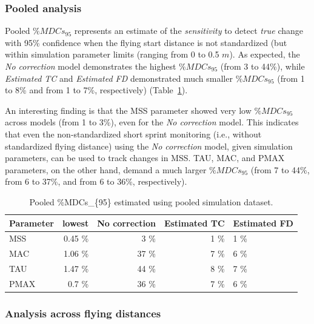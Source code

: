 \documentclass[
  letterpaper,
  DIV=11,
  numbers=noendperiod]{scrartcl}
\begin{document}
\hypertarget{pooled-analysis-1}{%
\subsubsection{Pooled analysis}\label{pooled-analysis-1}}

Pooled \(\%MDCs_{95}\) represents an estimate of the \emph{sensitivity}
to detect \emph{true} change with 95\% confidence when the flying start
distance is not standardized (but within simulation parameter limits
(ranging from 0 to 0.5 \(m\)). As expected, the \emph{No correction}
model demonstrates the highest \(\%MDCs_{95}\) (from 3 to 44\%), while
\emph{Estimated TC} and \emph{Estimated FD} demonstrated much smaller
\(\%MDCs_{95}\) (from 1 to 8\% and from 1 to 7\%, respectively)
(Table~\ref{tbl-pooled-MDC}).

An interesting finding is that the MSS parameter showed very low
\(\%MDCs_{95}\) across models (from 1 to 3\%), even for the \emph{No
correction} model. This indicates that even the non-standardized short
sprint monitoring (i.e., without standardized flying distance) using the
\emph{No correction} model, given simulation parameters, can be used to
track changes in MSS. TAU, MAC, and PMAX parameters, on the other hand,
demand a much larger \(\%MDCs_{95}\) (from 7 to 44\%, from 6 to 37\%,
and from 6 to 36\%, respectively).

\hypertarget{tbl-pooled-MDC}{}
\begin{table}
\caption{\label{tbl-pooled-MDC}Pooled \%MDCs\_\{95\} estimated using pooled simulation dataset. }\tabularnewline

\centering
\begin{tabular}{lrrrl}
\toprule
Parameter & lowest & No correction & Estimated TC & Estimated FD\\
\midrule
MSS & 0.45 \% & 3 \% & 1 \% & 1 \%\\
MAC & 1.06 \% & 37 \% & 7 \% & 6 \%\\
TAU & 1.47 \% & 44 \% & 8 \% & 7 \%\\
PMAX & 0.7 \% & 36 \% & 7 \% & 6 \%\\
\bottomrule
\end{tabular}
\end{table}

\hypertarget{analysis-across-flying-distances-1}{%
\subsubsection{Analysis across flying
distances}\label{analysis-across-flying-distances-1}}
\end{document}
